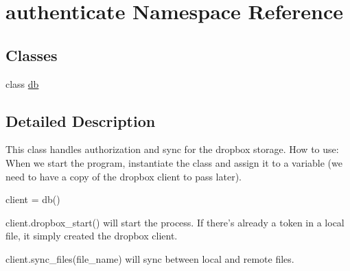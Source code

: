 \hypertarget{namespaceauthenticate}{\section{authenticate Namespace Reference}
\label{namespaceauthenticate}
}
\subsection*{Classes}
\begin{DoxyCompactItemize}
\item 
class \hyperlink{classauthenticate_1_1db}{db}
\end{DoxyCompactItemize}


\subsection{Detailed Description}
\begin{DoxyVerb}This class handles authorization and sync for the dropbox storage. How to use:
When we start the program, instantiate the class and assign it to a variable (we
need to have a copy of the dropbox client to pass later).
  
client = db()
  
client.dropbox_start() will start the process. If there's already a token in a
local file, it simply created the dropbox client.
  
client.sync_files(file_name) will sync between local and remote files.
\end{DoxyVerb}
 